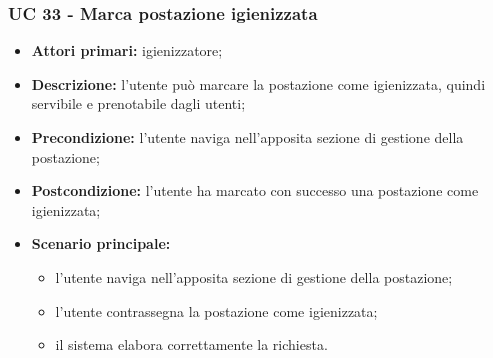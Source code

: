 \subsubsection{UC 33 - Marca postazione igienizzata}

\begin{itemize}
\item \textbf{Attori primari:} igienizzatore;
\item \textbf{Descrizione:} l'utente può marcare la postazione come igienizzata, quindi servibile e prenotabile dagli utenti;
\item \textbf{Precondizione:} l'utente naviga nell’apposita sezione di gestione della postazione; 
\item \textbf{Postcondizione:} l’utente ha marcato con successo una postazione come igienizzata;
\item \textbf{Scenario principale:} 
	\begin{itemize}
		\item l'utente naviga nell’apposita sezione di gestione della postazione;		
		\item l’utente contrassegna la postazione come igienizzata;
		\item il sistema elabora correttamente la richiesta.
	\end{itemize}
\end{itemize}



